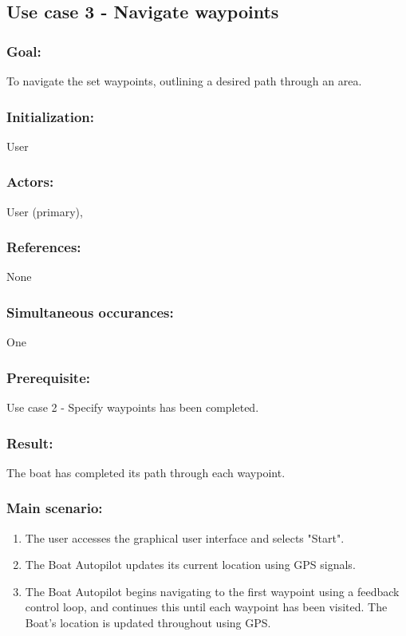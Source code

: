 \begin{framed}
	\subsection{Use case 3 - Navigate waypoints}
	\subsubsection*{Goal:}
	To navigate the set waypoints, outlining a desired path through an area.
	
	\subsubsection*{Initialization:}
	User
	
	\subsubsection*{Actors:}
	User (primary), 
	
	\subsubsection*{References:}
	None
	
	\subsubsection*{Simultaneous occurances:}
	One
	
	\subsubsection*{Prerequisite:}
	Use case 2 - Specify waypoints has been completed.
	
	\subsubsection*{Result:}
	The boat has completed its path through each waypoint.
	
	\subsubsection*{Main scenario:}
	\begin{enumerate}
		\item The user accesses the graphical user interface and selects "Start".
		\item The Boat Autopilot updates its current location using GPS signals.
		\item The Boat Autopilot begins navigating to the first waypoint using a feedback control loop, and continues this until each waypoint has been visited. The Boat's location is updated throughout using GPS.
	\end{enumerate}	
\end{framed}
